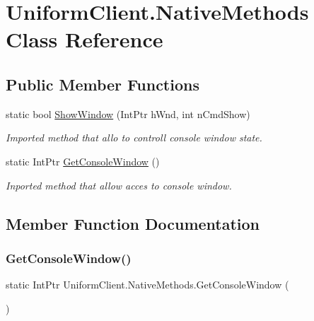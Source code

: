 \hypertarget{class_uniform_client_1_1_native_methods}{}\section{Uniform\+Client.\+Native\+Methods Class Reference}
\label{class_uniform_client_1_1_native_methods}
\subsection*{Public Member Functions}
\begin{DoxyCompactItemize}
\item 
static bool \mbox{\hyperlink{class_uniform_client_1_1_native_methods_a067dec2d455070ab352fef3caef7b323}{Show\+Window}} (Int\+Ptr h\+Wnd, int n\+Cmd\+Show)
\begin{DoxyCompactList}\small\item\em Imported method that allo to controll console window state. \end{DoxyCompactList}\item 
static Int\+Ptr \mbox{\hyperlink{class_uniform_client_1_1_native_methods_ab6b4879e450856c501624a55094ead5b}{Get\+Console\+Window}} ()
\begin{DoxyCompactList}\small\item\em Inported method that allow acces to console window. \end{DoxyCompactList}\end{DoxyCompactItemize}


\subsection{Member Function Documentation}
\mbox{\label{class_uniform_client_1_1_native_methods_ab6b4879e450856c501624a55094ead5b}} 
\subsubsection{\texorpdfstring{Get\+Console\+Window()}{GetConsoleWindow()}}
{\footnotesize\ttfamily static Int\+Ptr Uniform\+Client.\+Native\+Methods.\+Get\+Console\+Window (\begin{DoxyParamCaption}{ }\end{DoxyParamCaption})}



